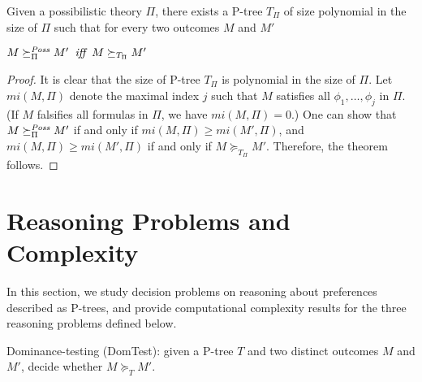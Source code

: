 
\begin{thm}
\label{thm:Poss_P}
	Given a possibilistic theory $\Pi$, there exists a P-tree $T_\Pi$ of size
	polynomial in the size of $\Pi$ such that for every two outcomes $M$ and $M'$
	\begin{center}
		$M \succeq_\Pi^{\textit{Poss}} M' \;\; \textit{iff} \;\; M \succeq_{T_\Pi} M'$
	\end{center}
\end{thm}
\begin{proof}
	It is clear that the size of P-tree $T_\Pi$ is polynomial in the size of $\Pi$.
	Let $mi(M,\Pi)$ denote the maximal index $j$ such that $M$ satisfies
	all $\phi_1, \ldots, \phi_j$ in $\Pi$.
	(If $M$ falsifies all formulas in $\Pi$, we have $mi(M,\Pi)=0$.)
	One can show that $M \succeq_\Pi^{\textit{Poss}} M'$ if and only if
	$mi(M,\Pi) \geq mi(M',\Pi)$, and $mi(M,\Pi) \geq mi(M',\Pi)$ if and only
	if $M \succeq_{T_\Pi} M'$.  Therefore, the theorem follows.
\end{proof}



\section{Reasoning Problems and Complexity}

In this section, we study decision problems on reasoning about preferences described as
P-trees, and provide computational complexity results for the three reasoning
problems defined below.

\begin{definition}
\label{def:dom}
  Dominance-testing ({\sc DomTest}): given a P-tree $T$ and two distinct outcomes
  $M$ and $M'$, decide whether $M \succeq_T M'$.
\end{definition}

